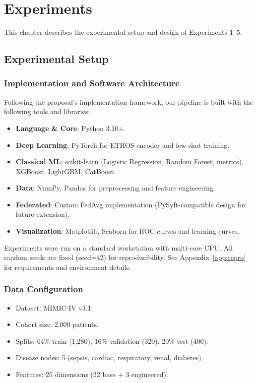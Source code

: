 \chapter{Experiments}
\label{ch:experiments}

This chapter describes the experimental setup and design of Experiments 1--5.

\section{Experimental Setup}

\subsection{Implementation and Software Architecture}

Following the proposal's implementation framework, our pipeline is built with the following tools and libraries:

\begin{itemize}
\item \textbf{Language \& Core}: Python 3.10+.
\item \textbf{Deep Learning}: PyTorch for ETHOS encoder and few-shot training.
\item \textbf{Classical ML}: scikit-learn (Logistic Regression, Random Forest, metrics), XGBoost, LightGBM, CatBoost.
\item \textbf{Data}: NumPy, Pandas for preprocessing and feature engineering.
\item \textbf{Federated}: Custom FedAvg implementation (PySyft-compatible design for future extension).
\item \textbf{Visualization}: Matplotlib, Seaborn for ROC curves and learning curves.
\end{itemize}

Experiments were run on a standard workstation with multi-core CPU. All random seeds are fixed (seed=42) for reproducibility. See Appendix~\ref{app:repro} for requirements and environment details.

\subsection{Data Configuration}

\begin{itemize}
\item Dataset: MIMIC-IV v3.1.
\item Cohort size: 2,000 patients.
\item Splits: 64\% train (1,280), 16\% validation (320), 20\% test (400).
\item Disease nodes: 5 (sepsis, cardiac, respiratory, renal, diabetes).
\item Features: 25 dimensions (22 base + 3 engineered).
\end{itemize}


